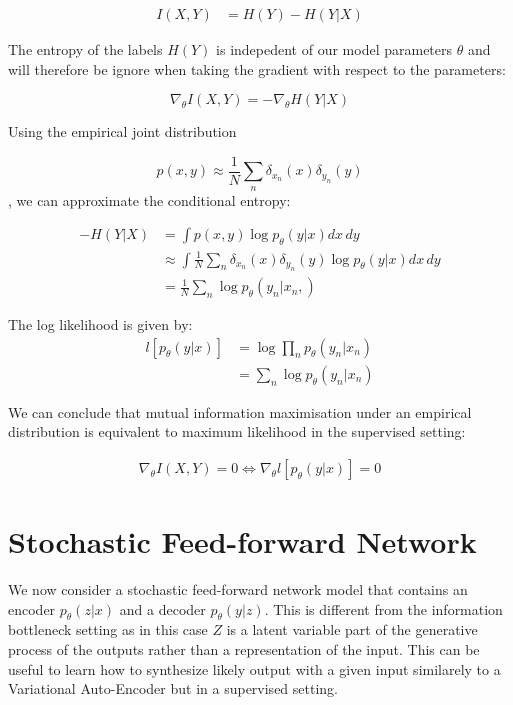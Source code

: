 \documentclass[10pt,oneside,openright]{report}
\begin{document}
\begin{align}
I(X, Y) &= H(Y) - H(Y|X)
\end{align}

The entropy of the labels $H(Y)$ is indepedent of our model parameters $\theta$ and will therefore be ignore when taking the gradient with respect to the parameters:

$$ \nabla_\theta I(X,Y) = -\nabla_\theta H(Y|X)$$ 

Using the empirical joint distribution 

$$p(x, y) \approx \frac{1}{N}\sum_n\delta_{x_n}(x)\delta_{y_n}(y)$$, we can approximate the conditional entropy:

\begin{align}
- H(Y|X) &= \int p(x, y) \log p_\theta(y|x) dx\, dy\\
	      &\approx \int \frac{1}{N}\sum_n\delta_{x_n}(x)\delta_{y_n}(y) \log p_\theta(y|x)dx\, dy\\
	      &= \frac{1}{N} \sum_n \log p_\theta(y_n|x_n,)
\end{align}

The log likelihood is given by:
\begin{align}
 l[p_\theta(y|x)] &= \log \prod_n p_\theta(y_n|x_n)\\
 	      &= \sum_n \log p_\theta(y_n|x_n)
\end{align}

We can conclude that mutual information maximisation under an empirical distribution is equivalent to maximum likelihood in the supervised setting:

\begin{align}
\nabla_\theta I(X,Y) = 0 \Leftrightarrow \nabla_\theta l[p_\theta(y|x)] = 0
\end{align}

\section{Stochastic Feed-forward Network}

We now consider a stochastic feed-forward network model that contains an encoder $p_\theta(z|x)$ and a decoder $p_\theta(y|z)$. This is different from the information bottleneck setting as in this case $Z$ is a latent variable part of the generative process of the outputs rather than a representation of the input. This can be useful to learn how to synthesize likely output with a given input similarely to a Variational Auto-Encoder \cite{vae} but in a supervised setting.
\end{document}
